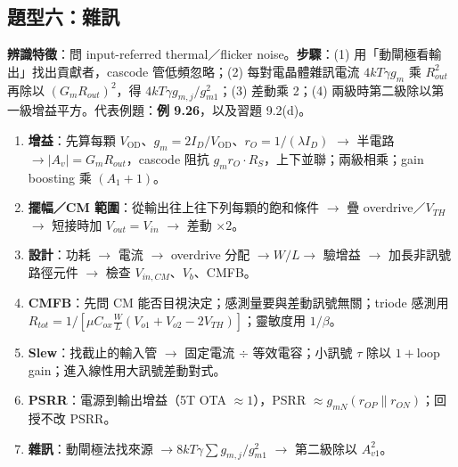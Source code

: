 \documentclass[11pt,a4paper]{article}
\newcommand{\pl}{\mathbin{\|}}
\newcommand{\OD}[1]{V_{\text{OD}#1}}
\newcommand{\exref}[1]{\textcolor{extag}{\textbf{\sffamily 例 #1}}}
\begin{document}
\subsection{題型六：雜訊}
\textbf{辨識特徵}：問 input-referred thermal／flicker noise。\textbf{步驟}：(1) 用「動閘極看輸出」找出貢獻者，cascode 管低頻忽略；(2) 每對電晶體雜訊電流 $4kT\gamma g_m$ 乘 $R_{out}^2$ 再除以 $(G_mR_{out})^2$，得 $4kT\gamma g_{m,j}/g_{m1}^2$；(3) 差動乘 2；(4) 兩級時第二級除以第一級增益平方。代表例題：\exref{9.26}，以及習題 9.2(d)。

\begin{recipebox}[解題流程總整理]
\begin{enumerate}[leftmargin=2.2em]
  \item \textbf{增益}：先算每顆 $\OD{}$、$g_m=2I_D/\OD{}$、$r_O=1/(\lambda I_D)$ $\to$ 半電路 $\to|A_v|=G_mR_{out}$，cascode 阻抗 $g_mr_O\cdot R_S$，上下並聯；兩級相乘；gain boosting 乘 $(A_1+1)$。
  \item \textbf{擺幅／CM 範圍}：從輸出往上往下列每顆的飽和條件 $\to$ 疊 overdrive／$V_{TH}$ $\to$ 短接時加 $V_{out}=V_{in}$ $\to$ 差動 $\times2$。
  \item \textbf{設計}：功耗 $\to$ 電流 $\to$ overdrive 分配 $\to W/L\to$ 驗增益 $\to$ 加長非訊號路徑元件 $\to$ 檢查 $V_{in,CM}$、$V_b$、CMFB。
  \item \textbf{CMFB}：先問 CM 能否目視決定；感測量要與差動訊號無關；triode 感測用 $R_{tot}=1/[\mu C_{ox}\frac WL(V_{o1}+V_{o2}-2V_{TH})]$；靈敏度用 $1/\beta$。
  \item \textbf{Slew}：找截止的輸入管 $\to$ 固定電流 $\div$ 等效電容；小訊號 $\tau$ 除以 $1+$loop gain；進入線性用大訊號差動對式。
  \item \textbf{PSRR}：電源到輸出增益（5T OTA $\approx1$），PSRR $\approx g_{mN}(r_{OP}\pl r_{ON})$；回授不改 PSRR。
  \item \textbf{雜訊}：動閘極法找來源 $\to 8kT\gamma\sum g_{m,j}/g_{m1}^2$ $\to$ 第二級除以 $A_{v1}^2$。
\end{enumerate}
\end{recipebox}
\end{document}
